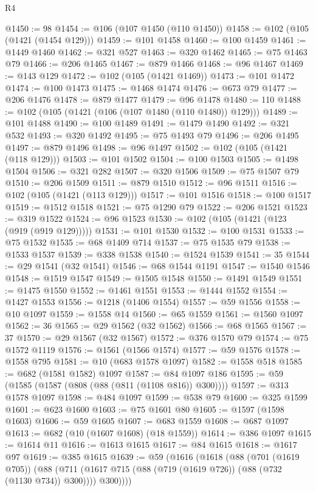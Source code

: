 \begin{lexlean}{R4}
\begin{coremodule}
@1450 := 98
@1454 := @106 (@107 @1450 (@110 @1450))
@1458 := @102 (@105 (@1421 (@1454 @129)))
@1459 := @101 @1458
@1460 := @100 @1459
@1461 := @1449 @1460
@1462 := @321 @527
@1463 := @320 @1462
@1465 := @75 @1463 @79
@1466 := @206 @1465
@1467 := @879 @1466
@1468 := @96 @1467
@1469 := @143 @129
@1472 := @102 (@105 (@1421 @1469))
@1473 := @101 @1472
@1474 := @100 @1473
@1475 := @1468 @1474
@1476 := @673 @79
@1477 := @206 @1476
@1478 := @879 @1477
@1479 := @96 @1478
@1480 := 110
@1488 := @102 (@105 (@1421 (@106 (@107 @1480 (@110 @1480)) @129)))
@1489 := @101 @1488
@1490 := @100 @1489
@1491 := @1479 @1490
@1492 := @321 @532
@1493 := @320 @1492
@1495 := @75 @1493 @79
@1496 := @206 @1495
@1497 := @879 @1496
@1498 := @96 @1497
@1502 := @102 (@105 (@1421 (@118 @129)))
@1503 := @101 @1502
@1504 := @100 @1503
@1505 := @1498 @1504
@1506 := @321 @282
@1507 := @320 @1506
@1509 := @75 @1507 @79
@1510 := @206 @1509
@1511 := @879 @1510
@1512 := @96 @1511
@1516 := @102 (@105 (@1421 (@113 @129)))
@1517 := @101 @1516
@1518 := @100 @1517
@1519 := @1512 @1518
@1521 := @75 @1290 @79
@1522 := @206 @1521
@1523 := @319 @1522
@1524 := @96 @1523
@1530 := @102 (@105 (@1421 (@123 (@919 (@919 @129)))))
@1531 := @101 @1530
@1532 := @100 @1531
@1533 := @75 @1532
@1535 := @68 @1409 @714
@1537 := @75 @1535 @79
@1538 := @1533 @1537
@1539 := @338 @1538
@1540 := @1524 @1539
@1541 := 35
@1544 := @29 @1541 (@32 @1541)
@1546 := @68 @1544 @1191
@1547 := @1540 @1546
@1548 := @1519 @1547
@1549 := @1505 @1548
@1550 := @1491 @1549
@1551 := @1475 @1550
@1552 := @1461 @1551
@1553 := @1444 @1552
@1554 := @1427 @1553
@1556 := @1218 (@1406 @1554)
@1557 := @59 @1556
@1558 := @10 @1097
@1559 := @1558 @14
@1560 := @65 @1559
@1561 := @1560 @1097
@1562 := 36
@1565 := @29 @1562 (@32 @1562)
@1566 := @68 @1565
@1567 := 37
@1570 := @29 @1567 (@32 @1567)
@1572 := @376 @1570 @79
@1574 := @75 @1572 @1119
@1576 := @1561 (@1566 @1574)
@1577 := @59 @1576
@1578 := @1558 @795
@1581 := @10 (@683 @1578 @1097)
@1582 := @1558 @518
@1585 := @682 (@1581 @1582) @1097
@1587 := @84 @1097 @186
@1595 := @59 (@1585 (@1587 (@808 (@88 (@811 (@1108 @816)) @300))))
@1597 := @313 @1578 @1097
@1598 := @484 @1097
@1599 := @538 @79
@1600 := @325 @1599
@1601 := @623 @1600
@1603 := @75 @1601 @80
@1605 := @1597 (@1598 @1603)
@1606 := @59 @1605
@1607 := @683 @1559
@1608 := @687 @1097
@1613 := @682 (@10 (@1607 @1608) (@18 @1559))
@1614 := @386 @1097
@1615 := @1614 @11
@1616 := @1613 @1615
@1617 := @84 @1615
@1618 := @1617 @97
@1619 := @385 @1615
@1639 := @59
    (@1616
      (@1618
        (@88
          (@701 (@1619 @705))
          (@88 (@711 (@1617 @715 (@88 (@719 (@1619 @726)) (@88 (@732 (@1130 @734)) @300)))) @300))))

\end{coremodule}
\end{lexlean}
